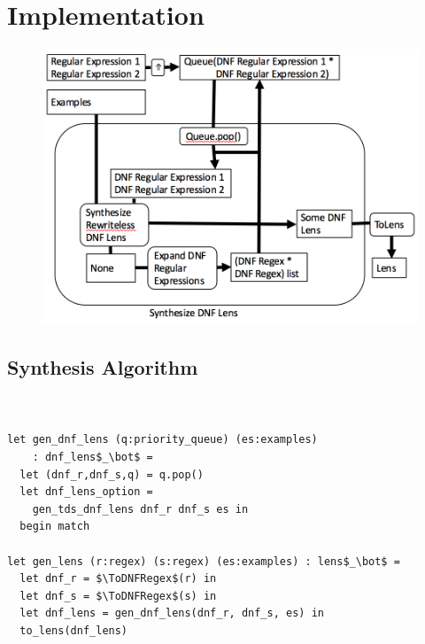 \section{Implementation}
\begin{figure}
\includegraphics[scale=.5]{synth-lens-schematic.png}
\label{img:synth-lens-schematic}
\end{figure}

\subsection{Synthesis Algorithm}
\begin{lstlisting}[mathescape]


let gen_dnf_lens (q:priority_queue) (es:examples)
    : dnf_lens$_\bot$ =
  let (dnf_r,dnf_s,q) = q.pop()
  let dnf_lens_option =
    gen_tds_dnf_lens dnf_r dnf_s es in
  begin match 

let gen_lens (r:regex) (s:regex) (es:examples) : lens$_\bot$ =
  let dnf_r = $\ToDNFRegex$(r) in
  let dnf_s = $\ToDNFRegex$(s) in
  let dnf_lens = gen_dnf_lens(dnf_r, dnf_s, es) in
  to_lens(dnf_lens)
\end{lstlisting}
